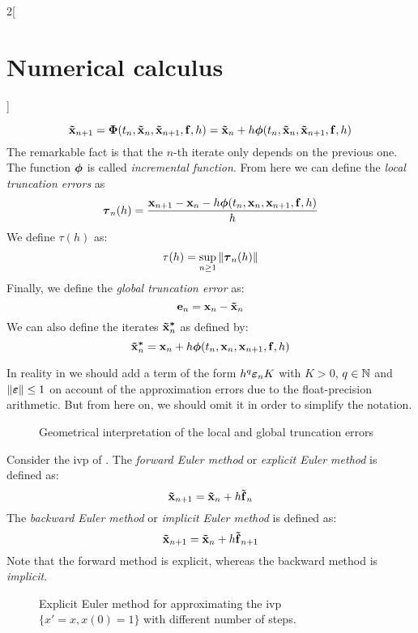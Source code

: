 \documentclass[../../../main_math.tex]{subfiles}
\begin{document}
\begin{multicols}{2}[\section{Numerical calculus}]
\begin{definition}
    \begin{equation}\label{NC:onestep}
      \boldsymbol{\mathrm{\tilde{x}}}_{n+1}=\boldsymbol{\mathrm{\Phi}}(t_n,\boldsymbol{\mathrm{\tilde{x}}}_{n},\boldsymbol{\mathrm{\tilde{x}}}_{n+1},\boldsymbol{\mathrm{f}},h)=\boldsymbol{\mathrm{\tilde{x}}}_{n}+h\boldsymbol{\mathrm{\phi}}(t_n,\boldsymbol{\mathrm{\tilde{x}}}_{n},\boldsymbol{\mathrm{\tilde{x}}}_{n+1},\boldsymbol{\mathrm{f}},h)
    \end{equation}
    The remarkable fact is that the $n$-th iterate only depends on the previous one.
    The function $\boldsymbol{\mathrm{\phi}}$ is called \emph{incremental function}. From here we can define the \emph{local truncation errors} as
    $$\boldsymbol{\mathrm{\tau}}_{n}(h)=\frac{\boldsymbol{\mathrm{x}}_{n+1}-\boldsymbol{\mathrm{x}}_{n}-h\boldsymbol{\mathrm{\phi}}(t_n,\boldsymbol{\mathrm{x}}_{n},\boldsymbol{\mathrm{x}}_{n+1},\boldsymbol{\mathrm{f}},h)}{h}$$
    We define $\tau(h)$ as: $$\tau(h)=\sup_{n\geq 1}\left\|\boldsymbol{\mathrm{\tau}}_n(h)\right\|$$
    Finally, we define the \emph{global truncation error} as:
    $$\boldsymbol{\mathrm{e}}_n=\boldsymbol{\mathrm{x}}_n-\boldsymbol{\mathrm{\tilde{x}}}_n$$
    We can also define the iterates $\boldsymbol{\mathrm{\tilde{x}}}_n^{\boldsymbol{\mathrm{*}}}$ as defined by:
    $$\boldsymbol{\mathrm{\tilde{x}}}_n^{\boldsymbol{\mathrm{*}}}=\boldsymbol{\mathrm{x}}_{n}+h\boldsymbol{\mathrm{\phi}}(t_n,\boldsymbol{\mathrm{x}}_{n},\boldsymbol{\mathrm{x}}_{n+1},\boldsymbol{\mathrm{f}},h)$$
  \end{definition}
  \begin{remark}
    In reality in  we should add a term of the form $h^{q}\boldsymbol{\mathrm{\varepsilon}}_nK$ with $K>0$, $q\in\mathbb{N}$ and $\left\|\boldsymbol{\mathrm{\varepsilon}}\right\|\leq 1$ on account of the approximation errors due to the float-precision arithmetic. But from here on, we should omit it in order to simplify the notation.
  \end{remark}
  \begin{figure}[H]
    \centering
    
    \caption{Geometrical interpretation of the local and global truncation errors}
    \label{NC:errors_fig}
  \end{figure}
  \begin{definition}\label{NC:euler}
    Consider the ivp of . The \emph{forward Euler method} or \emph{explicit Euler method} is defined as:
    $$\boldsymbol{\mathrm{\tilde{x}}}_{n+1}=\boldsymbol{\mathrm{\tilde{x}}}_{n}+h\boldsymbol{\mathrm{\tilde{f}}}_n$$
    The \emph{backward Euler method} or \emph{implicit Euler method} is defined as:
    $$\boldsymbol{\mathrm{\tilde{x}}}_{n+1}=\boldsymbol{\mathrm{\tilde{x}}}_{n}+h\boldsymbol{\mathrm{\tilde{f}}}_{n+1}$$
    Note that the forward method is explicit, whereas the backward method is \emph{implicit}.
  \end{definition}
  \begin{figure}[H]
    \centering
    
    \caption{Explicit Euler method for approximating the ivp $\{x'=x, x(0)=1\}$ with different number of steps.}

\end{figure}
\end{multicols}
\end{document}
